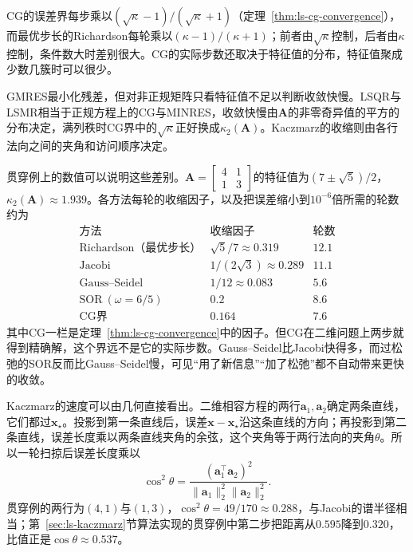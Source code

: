 CG的误差界每步乘以$(\sqrt\kappa-1)/(\sqrt\kappa+1)$（定理~\ref{thm:ls-cg-convergence}），而最优步长的Richardson每轮乘以$(\kappa-1)/(\kappa+1)$；前者由$\sqrt\kappa$控制，后者由$\kappa$控制，条件数大时差别很大。CG的实际步数还取决于特征值的分布，特征值聚成少数几簇时可以很少。

GMRES最小化残差，但对非正规矩阵只看特征值不足以判断收敛快慢。LSQR与LSMR相当于正规方程上的CG与MINRES，收敛快慢由$\bm A$的非零奇异值的平方的分布决定，满列秩时CG界中的$\sqrt\kappa$正好换成$\kappa_2(\bm A)$。Kaczmarz的收缩则由各行法向之间的夹角和访问顺序决定。

贯穿例上的数值可以说明这些差别。$\bm A=\left[\begin{smallmatrix}4&1\\1&3\end{smallmatrix}\right]$的特征值为$(7\pm\sqrt5)/2$，$\kappa_2(\bm A)\approx1.939$。各方法每轮的收缩因子，以及把误差缩小到$10^{-6}$倍所需的轮数约为
\[
 \begin{array}{lcc}
  \text{方法} & \text{收缩因子} & \text{轮数}\\
  \text{Richardson（最优步长）} & \sqrt5/7\approx0.319 & 12.1\\
  \text{Jacobi} & 1/(2\sqrt3)\approx0.289 & 11.1\\
  \text{Gauss--Seidel} & 1/12\approx0.083 & 5.6\\
  \text{SOR}\ (\omega=6/5) & 0.2 & 8.6\\
  \text{CG界} & 0.164 & 7.6
 \end{array}
\]
其中CG一栏是定理~\ref{thm:ls-cg-convergence}中的因子。但CG在二维问题上两步就得到精确解，这个界远不是它的实际步数。Gauss--Seidel比Jacobi快得多，而过松弛的SOR反而比Gauss--Seidel慢，可见“用了新信息”“加了松弛”都不自动带来更快的收敛。

Kaczmarz的速度可以由几何直接看出。二维相容方程的两行$\bm a_1,\bm a_2$确定两条直线，它们都过$\bm x_\star$。投影到第一条直线后，误差$\bm x-\bm x_\star$沿这条直线的方向；再投影到第二条直线，误差长度乘以两条直线夹角的余弦，这个夹角等于两行法向的夹角$\theta$。所以一轮扫掠后误差长度乘以
\begin{equation}
 \cos^2\theta=\frac{(\bm a_1^\top\bm a_2)^2}{\lVert\bm a_1\rVert_2^2\lVert\bm a_2\rVert_2^2}.
 \label{eq:ls-kaczmarz-two-row-contraction}
\end{equation}
贯穿例的两行为$(4,1)$与$(1,3)$，$\cos^2\theta=49/170\approx0.288$，与Jacobi的谱半径相当；第~\ref{sec:ls-kaczmarz}节算法实现的贯穿例中第二步把距离从$0.595$降到$0.320$，比值正是$\cos\theta\approx0.537$。

